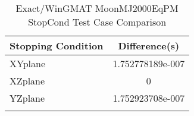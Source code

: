 \begin{table}[htbp!]
\centering
\caption{ Exact/WinGMAT MoonMJ2000EqPM StopCond Test Case Comparison}
      \begin{tabular}{lc}
      \hline\hline
          Stopping Condition & Difference(s) \\
         \hline
         XYplane & 1.752778189e-007 \\
         XZplane & 0 \\
         YZplane & 1.752923708e-007 \\
      \hline\hline
      \label{Table: Exact-WinGMAT MoonMJ2000EqPM StopCond Table} 
\end{tabular}
\end{table}
